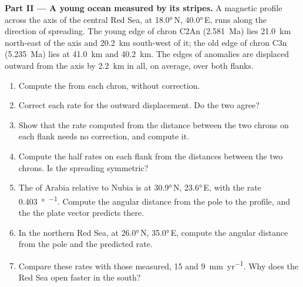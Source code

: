 \begin{problem}
\medskip
\noindent\textbf{Part II --- A young ocean measured by its stripes.} A
magnetic profile across the axis of the central Red Sea, at
\ang{18.0}\,N, \ang{40.0}\,E, runs along the direction of spreading. The young
edge of chron C2An (\qty{2.581}{Ma}) lies \qty{21.0}{km} north-east of the
axis and \qty{20.2}{km} south-west of it; the old edge of chron C3n
(\qty{5.235}{Ma}) lies at \qty{41.0}{km} and \qty{40.2}{km}. The edges of
anomalies are displaced outward from the axis by \qty{2.2}{km} in all, on
average, over both flanks.
\begin{enumerate}[resume]
  \item Compute the  from each chron, without correction.
  \item Correct each rate for the outward displacement. Do the two agree?
  \item Show that the rate computed from the distance between the two chrons on
        each flank needs no correction, and compute it.
  \item Compute the half rates on each flank from the distances between the two
        chrons. Is the spreading symmetric?
  \item The  of Arabia relative to Nubia is at \ang{30.9}\,N,
        \ang{23.6}\,E, with the rate \qty{0.403}{\degree\per\Myr}. Compute the
        angular distance from the pole to the profile, and the  the plate vector predicts there.
  \item In the northern Red Sea, at \ang{26.0}\,N, \ang{35.0}\,E, compute the
        angular distance from the pole and the predicted rate.
  \item Compare these rates with those measured, 15 and
        \qty{9}{mm.yr^{-1}}. Why does the Red Sea open faster in the south?
\end{enumerate}


\end{problem}
